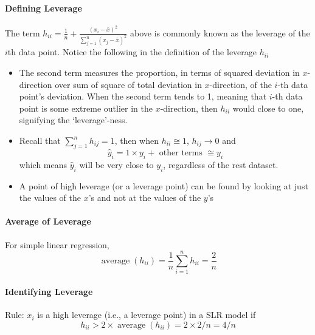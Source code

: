 \documentclass[11pt]{article}
\begin{document}
\paragraph{Defining Leverage} 
The term $h_{i i}=\frac{1}{n}+\frac{\left(x_{i}-\bar{x}\right)^{2}}{\sum_{j=1}^{n}\left(x_{j}-\bar{x}\right)^{2}}$ above is commonly known as the leverage of the $i$th data point. Notice the following in the definition of the leverage $h_{ii}$
\begin{itemize}
    \item The second term measures the proportion, in terms of squared deviation in $x$-direction over sum of square of total deviation in $x$-direction, of the $i$-th data point's deviation. When the second term tends to 1, meaning that $i$-th data point is some extreme outlier in the $x$-direction, then $h_{ii}$ would close to one, signifying the `leverage'-ness. 
    \item Recall that $\sum_{j=1}^{n} h_{i j}=1$, then when $h_{i i} \cong 1$, $h_{ij}\rightarrow 0$ and
        \begin{equation*}
            \hat{y}_{i}=1 \times y_{i}+\text { other terms } \cong y_{i}
        \end{equation*}
    which means $\hat{y}_{i}$  will be very close to $y_i$, regardless of the rest dataset. 
    \item A point of high leverage (or a leverage point) can be found by looking at just the values of the $x$’s and not at the values of the $y$’s
\end{itemize}

\paragraph{Average of Leverage} For simple linear regression, 
\begin{equation*}
    \operatorname{average}\left(h_{i i}\right) = \frac{1}{n}\sum_{i = 1}^n h_{ii} =\frac{2}{n}
\end{equation*}

\paragraph{Identifying Leverage} Rule: $x_i$ is a high leverage (i.e., a leverage point) in a SLR model if 
\begin{equation*}
    h_{i i}>2 \times \operatorname{average}\left(h_{i i}\right)=2 \times 2 / n=4 / n
\end{equation*}
\end{document}
